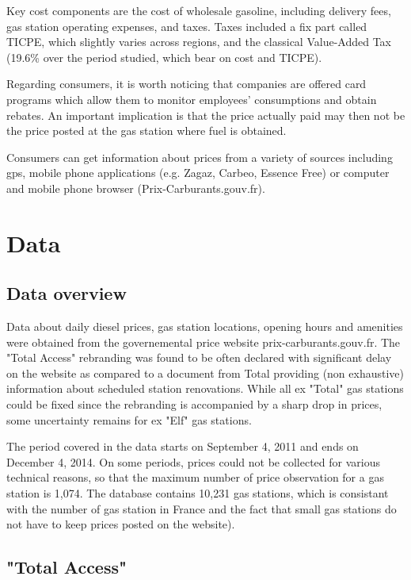 \documentclass[11pt]{article}
\begin{document}
Key cost components are the cost of wholesale gasoline, including delivery fees,  gas station operating expenses, and taxes. Taxes included a fix part called TICPE, which slightly varies across regions, and the classical Value-Added Tax (19.6\% over the period studied, which bear on cost and TICPE).

Regarding consumers, it is worth noticing that companies are offered card programs which allow them to monitor employees' consumptions and obtain rebates. An important implication is that the price actually paid may then not be the price posted at the gas station where fuel is obtained.

Consumers can get information about prices from a variety of sources including gps, mobile phone applications (e.g. Zagaz, Carbeo, Essence Free) or computer and mobile phone browser (Prix-Carburants.gouv.fr).

\section{Data}

\subsection{Data overview}

Data about daily diesel prices, gas station locations, opening hours and amenities were obtained from the governemental price  website prix-carburants.gouv.fr. The "Total Access" rebranding was found to be often declared with significant delay on the website as compared to a document from Total providing (non exhaustive) information about scheduled station renovations. While all ex "Total" gas stations could be fixed since the rebranding is accompanied by a sharp drop in prices, some uncertainty remains for ex "Elf" gas stations.

The period covered in the data starts on September 4, 2011 and ends on December 4, 2014. On some periods, prices could not be collected for various technical reasons, so that the maximum number of price observation for a gas station is 1,074. The database contains 10,231 gas stations, which is consistant with the number of gas station in France and the fact that small gas stations do not have to keep prices posted on the website).

\subsection{"Total Access"}
\end{document}
